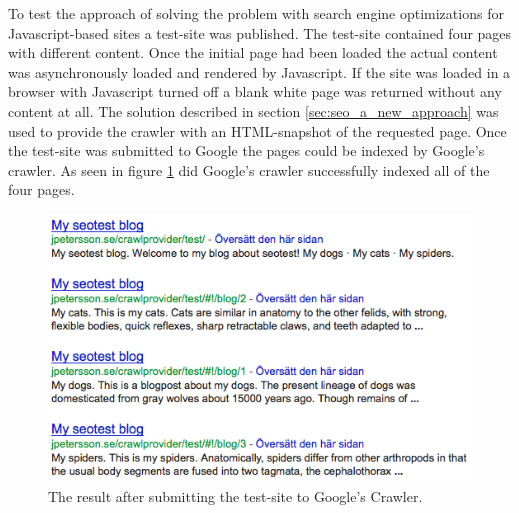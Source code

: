 To test the approach of solving the problem with search engine optimizations for Javascript-based sites a test-site was published. The test-site contained four pages with different content. Once the initial page had been loaded the actual content was asynchronously loaded and rendered by Javascript. If the site was loaded in a browser with Javascript turned off a blank white page was returned without any content at all. The solution described in section \ref{sec:seo_a_new_approach} was used to provide the crawler with an HTML-snapshot of the requested page. Once the test-site was submitted to Google the pages could be indexed by Google's crawler. As seen in figure \ref{fig:seotest_result} did Google's crawler successfully indexed all of the four pages. 

\begin{figure}[h!]
	\centerline{\includegraphics[width=120mm]{gfx/seotest.png}}
	\caption{The result after submitting the test-site to Google's Crawler.}
	\label{fig:seotest_result}
\end{figure}
